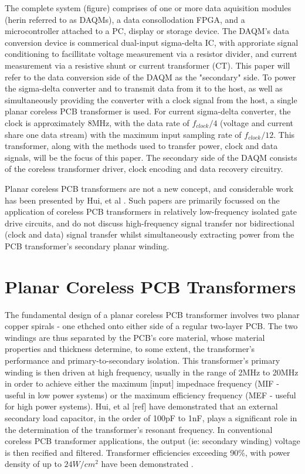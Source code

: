 \documentclass[conference]{IEEEtran}
\begin{document}
The complete system (figure) comprises of one or more data aquisition modules (herin referred to as DAQMs), a data consollodation FPGA, and a microcontroller attached to a PC, display or storage device.  
The DAQM's data conversion device is commerical dual-input sigma-delta IC, with approriate signal conditioning to facillitate voltage measurement via a resistor divider, and current measurement via a resistive shunt or current transformer (CT).  This paper will refer to the data conversion side of the DAQM as the "secondary" side.  To power the sigma-delta converter and to transmit data from it to the host, as well as simultaneously providing the converter with a clock signal from the host, a single planar coreless PCB transformer is used.  For current sigma-delta converter, the clock is approximately 8MHz, with the data rate of $ f_{clock}/4 $ (voltage and current share one data stream) with the maximum input sampling rate of $ f_{clock}/12 $.
This transformer, along with the methods used to transfer power, clock and data signals, will be the focus of this paper.  The secondary side of the DAQM consists of the coreless transformer driver, clock encoding and data recovery circuitry.  

Planar coreless PCB transformers are not a new concept, and considerable work has been presented by Hui, et al \cite{TangHuiFundamental}.  Such papers are primarily focussed on the application of coreless PCB transformers in relatively low-frequency isolated gate drive circuits, and do not discuss high-frequency signal transfer nor bidirectional (clock and data) signal transfer whilst simultaneously extracting power from the PCB transformer's secondary planar winding.


\section{Planar Coreless PCB Transformers}

The fundamental design of a planar coreless PCB transformer involves two planar copper spirals - one ethched onto either side of a regular two-layer PCB.  The two windings are thus separated by the PCB's core material, whose material properties and thickness determine, to some extent, the transformer's performance and primary-to-secondary isolation.  This transformer's primary winding is then driven at high frequency, usually in the range of 2MHz to 20MHz in order to achieve either the maximum [input] impednace frequency (MIF - useful in low power systems) or the maximum efficiency frequency (MEF - useful for high power systems).  Hui, et al [ref] have demonstrated that an external secondary load capacitor, in the order of 100pF to 1nF, plays a significant role in the determination of the transformer's resonant frequency.  In conventional coreless PCB transformer applications, the output (ie: secondary winding) voltage is then recified and filtered.  Transformer efficiencies exceeding 90\%, with power density of up to $ 24W/cm^{2} $ have been demonstrated \cite{TangHuiFundamental}.
\end{document}
